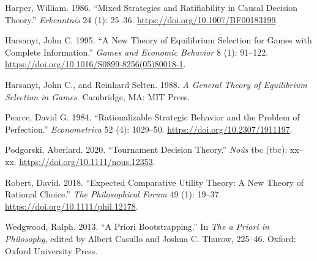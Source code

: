 \documentclass[
  12pt,
]{article}
\begin{document}
\leavevmode\hypertarget{ref-Harper1986}{}%
Harper, William. 1986. ``Mixed Strategies and Ratifiability in Causal
Decision Theory.'' \emph{Erkenntnis} 24 (1): 25--36.
\url{https://doi.org/10.1007/BF00183199}.

\leavevmode\hypertarget{ref-Harsanyi1995}{}%
Harsanyi, John C. 1995. ``A New Theory of Equilibrium Selection for
Games with Complete Information.'' \emph{Games and Economic Behavior} 8
(1): 91--122. \url{https://doi.org/10.1016/S0899-8256(05)80018-1}.

\leavevmode\hypertarget{ref-HarsanyiSelten1988}{}%
Harsanyi, John C., and Reinhard Selten. 1988. \emph{A General Theory of
Equilibrium Selection in Games}. Cambridge, MA: MIT Press.

\leavevmode\hypertarget{ref-Pearce1984}{}%
Pearce, David G. 1984. ``Rationalizable Strategic Behavior and the
Problem of Perfection.'' \emph{Econometrica} 52 (4): 1029--50.
\url{https://doi.org/10.2307/1911197}.

\leavevmode\hypertarget{ref-Podgorski2020}{}%
Podgorski, Aberlard. 2020. ``Tournament Decision Theory.'' \emph{Noûs}
tbc (tbc): xx--xx. \url{https://doi.org/10.1111/nous.12353}.

\leavevmode\hypertarget{ref-Robert2018}{}%
Robert, David. 2018. ``Expected Comparative Utility Theory: A New Theory
of Rational Choice.'' \emph{The Philosophical Forum} 49 (1): 19--37.
\url{https://doi.org/10.1111/phil.12178}.

\leavevmode\hypertarget{ref-Wedgwood2013}{}%
Wedgwood, Ralph. 2013. ``A Priori Bootstrapping.'' In \emph{The a Priori
in Philosophy}, edited by Albert Casullo and Joshua C. Thurow, 225--46.
Oxford: Oxford University Press.
\end{document}
